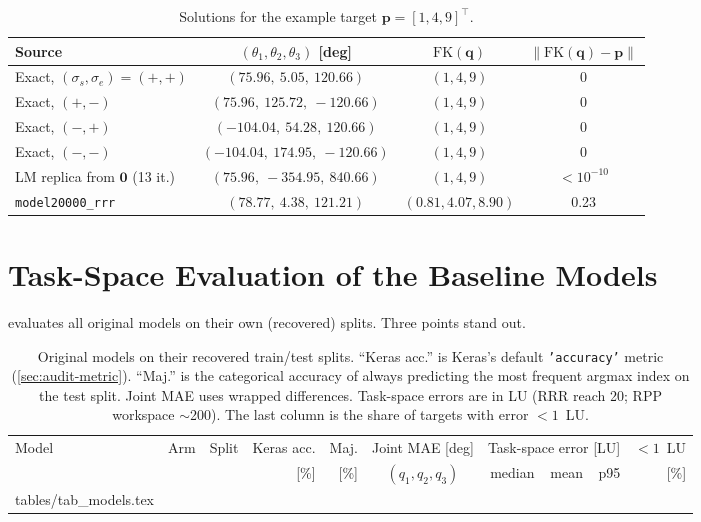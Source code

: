 \documentclass[conference]{IEEEtran}
\makeatletter
\newcommand{\tabinput}[1]{\@@input #1 }
\newcommand{\p}{\mathbf{p}}
\newcommand{\q}{\mathbf{q}}
\newcommand{\FK}{\mathrm{FK}}
\newcommand{\code}[1]{\texttt{#1}}
\makeatother
\begin{document}
\begin{table}[t]
\centering
\small
\caption{Solutions for the example target $\p=[1,4,9]^\top$.}
\label{tab:case}
\begin{tabular}{lccc}
\toprule
Source & $(\theta_1,\theta_2,\theta_3)$ [deg] & $\FK(\q)$ & $\|\FK(\q)-\p\|$ \\
\midrule
Exact, $(\sigma_s,\sigma_e)=(+,+)$ & $(75.96,\ 5.05,\ 120.66)$ & $(1, 4, 9)$ & 0 \\
Exact, $(+,-)$ & $(75.96,\ 125.72,\ -120.66)$ & $(1, 4, 9)$ & 0 \\
Exact, $(-,+)$ & $(-104.04,\ 54.28,\ 120.66)$ & $(1, 4, 9)$ & 0 \\
Exact, $(-,-)$ & $(-104.04,\ 174.95,\ -120.66)$ & $(1, 4, 9)$ & 0 \\
LM replica from $\mathbf{0}$ (13 it.) & $(75.96,\ -354.95,\ 840.66)$ & $(1, 4, 9)$ & $<10^{-10}$ \\
\midrule
\code{model20000\_rrr} & $(78.77,\ 4.38,\ 121.21)$ & $(0.81, 4.07, 8.90)$ & 0.23 \\
\bottomrule
\end{tabular}
\end{table}

\section{Task-Space Evaluation of the Baseline Models}
\label{sec:reeval}

 evaluates all original models on their own (recovered) splits. Three points stand out.

\begin{table}[t]
\centering
\small
\setlength{\tabcolsep}{4pt}
\caption{Original models on their recovered train/test splits. ``Keras acc.'' is Keras's default \code{'accuracy'} metric (\cref{sec:audit-metric}). ``Maj.'' is the categorical accuracy of always predicting the most frequent argmax index on the test split. Joint MAE uses wrapped differences. Task-space errors are in LU (RRR reach 20; RPP workspace $\sim$200). The last column is the share of targets with error $<1$~LU.}
\label{tab:models}
\begin{tabular}{lllrrcrrrr}
\toprule
Model & Arm & Split & Keras acc. & Maj. & Joint MAE [deg] & \multicolumn{3}{c}{Task-space error [LU]} & $<1$~LU \\
\cmidrule(lr){7-9}
 & & & [\%] & [\%] & $(q_1,q_2,q_3)$ & median & mean & p95 & [\%] \\
\midrule
\tabinput{tables/tab_models.tex}
\bottomrule
\end{tabular}
\end{table}
\end{document}
